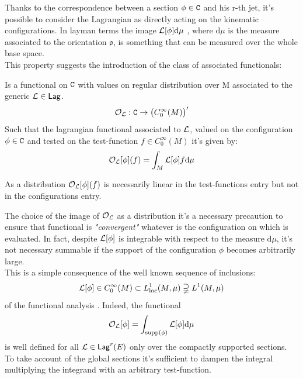\documentclass[Main]{subfiles}
\begin{document}
	
	Thanks to the correspondence between a section $\phi \in \mathtt{C}$ and his r-th jet, it's possible to consider the Lagrangian as directly acting on the kinematic configurations.
	In layman terms the image  $\mathcal{L} [ \phi ] \textrm{d}\mu$ , where $\textrm{d}\mu$ is the measure associated to the orientation $\mathfrak{o}$, is something that can be measured over the whole base space. 
	\\
	This property suggests the introduction of the class of associated functionals:
	\begin{definition}
		Is a functional on $\mathtt{C}$ with values on regular distribution over M associated to the generic $\mathcal{L} \in \mathsf{Lag}$.	
		\begin{displaymath}
			\mathcal{O}_{\mathcal{L}} : \mathtt{C} \rightarrow \big( C^\infty_0(M) \big)'
		\end{displaymath}			
			Such that the lagrangian functional associated to $\mathcal{L}$, valued on the configuration $\phi \in \mathtt{C}$ and tested on the test-function $f \in C^\infty_0(M)$ it's given by:
		\begin{displaymath}
			\mathcal{O}_{\mathcal{L}} [\phi] (f) = \int_M \mathcal{L} [\phi] f \textrm{d}\mu
		\end{displaymath}		
	\end{definition}	
	
	\begin{proposition}
		As a distribution $\mathcal{O}_{\mathcal{L}} [\phi] (f) $ is necessarily linear in the test-functions entry but not in the configurations entry.	
	\end{proposition}	
	
	\begin{observation}
		The choice of the image of $\mathcal{O}_{\mathcal{L}}$ as a distribution it's a necessary precaution to ensure that functional is \emph{"convergent"} whatever is the configuration on which is evaluated.
		In fact, despite $\mathcal{L} [ \phi ]$ is integrable with respect to the measure $\textrm{d}\mu$, it's not necessary summable if the support of the configuration $\phi$ becomes arbitrarily large.
		\\
		This is a simple consequence of the well known sequence of inclusions:
		\begin{displaymath}
			\mathcal{L} [ \phi ] \in C^\infty_0(M) \subset L^1_{\textrm{loc}}(M,\mu) \supsetneqq  L^1(M,\mu) 
		\end{displaymath}
		of the functional analysis .
		Indeed, the functional
		\begin{displaymath}
			\mathcal{O}_{\mathcal{L}} [\phi]= \int_{\textrm{supp}(\phi)} \mathcal{L} [\phi] \textrm{d}\mu
		\end{displaymath}
		is well defined for all $\mathcal{L} \in \mathsf{Lag}^r(E)$ only over the compactly supported sections. 
		To take account of the global sections it's sufficient to dampen the integral multiplying the integrand with an arbitrary test-function.
	\end{observation}
	
\end{document}
